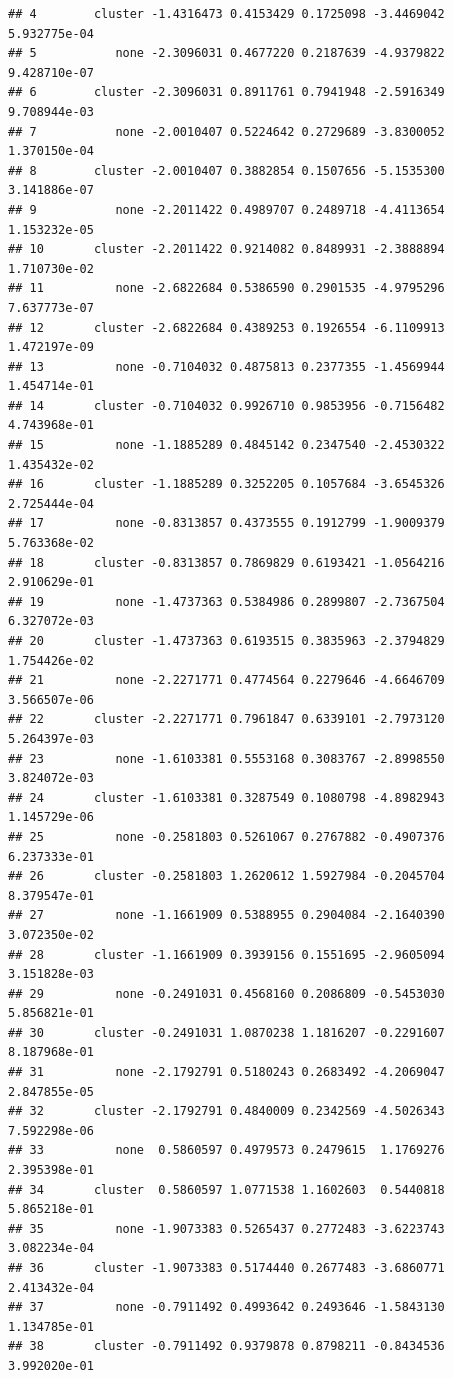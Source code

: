 \documentclass[
]{article}
\begin{document}
\begin{verbatim}
## 4        cluster -1.4316473 0.4153429 0.1725098 -3.4469042 5.932775e-04
## 5           none -2.3096031 0.4677220 0.2187639 -4.9379822 9.428710e-07
## 6        cluster -2.3096031 0.8911761 0.7941948 -2.5916349 9.708944e-03
## 7           none -2.0010407 0.5224642 0.2729689 -3.8300052 1.370150e-04
## 8        cluster -2.0010407 0.3882854 0.1507656 -5.1535300 3.141886e-07
## 9           none -2.2011422 0.4989707 0.2489718 -4.4113654 1.153232e-05
## 10       cluster -2.2011422 0.9214082 0.8489931 -2.3888894 1.710730e-02
## 11          none -2.6822684 0.5386590 0.2901535 -4.9795296 7.637773e-07
## 12       cluster -2.6822684 0.4389253 0.1926554 -6.1109913 1.472197e-09
## 13          none -0.7104032 0.4875813 0.2377355 -1.4569944 1.454714e-01
## 14       cluster -0.7104032 0.9926710 0.9853956 -0.7156482 4.743968e-01
## 15          none -1.1885289 0.4845142 0.2347540 -2.4530322 1.435432e-02
## 16       cluster -1.1885289 0.3252205 0.1057684 -3.6545326 2.725444e-04
## 17          none -0.8313857 0.4373555 0.1912799 -1.9009379 5.763368e-02
## 18       cluster -0.8313857 0.7869829 0.6193421 -1.0564216 2.910629e-01
## 19          none -1.4737363 0.5384986 0.2899807 -2.7367504 6.327072e-03
## 20       cluster -1.4737363 0.6193515 0.3835963 -2.3794829 1.754426e-02
## 21          none -2.2271771 0.4774564 0.2279646 -4.6646709 3.566507e-06
## 22       cluster -2.2271771 0.7961847 0.6339101 -2.7973120 5.264397e-03
## 23          none -1.6103381 0.5553168 0.3083767 -2.8998550 3.824072e-03
## 24       cluster -1.6103381 0.3287549 0.1080798 -4.8982943 1.145729e-06
## 25          none -0.2581803 0.5261067 0.2767882 -0.4907376 6.237333e-01
## 26       cluster -0.2581803 1.2620612 1.5927984 -0.2045704 8.379547e-01
## 27          none -1.1661909 0.5388955 0.2904084 -2.1640390 3.072350e-02
## 28       cluster -1.1661909 0.3939156 0.1551695 -2.9605094 3.151828e-03
## 29          none -0.2491031 0.4568160 0.2086809 -0.5453030 5.856821e-01
## 30       cluster -0.2491031 1.0870238 1.1816207 -0.2291607 8.187968e-01
## 31          none -2.1792791 0.5180243 0.2683492 -4.2069047 2.847855e-05
## 32       cluster -2.1792791 0.4840009 0.2342569 -4.5026343 7.592298e-06
## 33          none  0.5860597 0.4979573 0.2479615  1.1769276 2.395398e-01
## 34       cluster  0.5860597 1.0771538 1.1602603  0.5440818 5.865218e-01
## 35          none -1.9073383 0.5265437 0.2772483 -3.6223743 3.082234e-04
## 36       cluster -1.9073383 0.5174440 0.2677483 -3.6860771 2.413432e-04
## 37          none -0.7911492 0.4993642 0.2493646 -1.5843130 1.134785e-01
## 38       cluster -0.7911492 0.9379878 0.8798211 -0.8434536 3.992020e-01

\end{verbatim}
\end{document}
